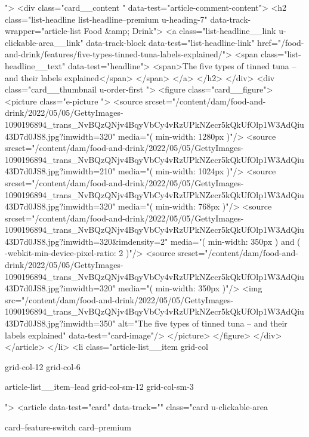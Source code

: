 {{{			 ">
<div class="card__content " data-test="article-comment-content">
<h2 class="list-headline list-headline--premium u-heading-7" data-track-wrapper="article-list Food &amp; Drink">
<a class="list-headline__link u-clickable-area__link" data-track-block data-test="list-headline-link" href="/food-and-drink/features/five-types-tinned-tuna-labels-explained/">
<span class="list-headline__text" data-test="headline">
<span>The five types of tinned tuna – and their labels explained</span>
</span>
</a>
</h2>
</div>
<div class="card__thumbnail u-order-first ">
<figure class="card__figure">
<picture class="e-picture   ">
<source srcset="/content/dam/food-and-drink/2022/05/05/GettyImages-1090196894_trans_NvBQzQNjv4BqyVbCy4vRzUPkNZecr5kQkUfOlp1W3AdQiu43D7d0JS8.jpg?imwidth=320" media="( min-width: 1280px )"/>
<source srcset="/content/dam/food-and-drink/2022/05/05/GettyImages-1090196894_trans_NvBQzQNjv4BqyVbCy4vRzUPkNZecr5kQkUfOlp1W3AdQiu43D7d0JS8.jpg?imwidth=210" media="( min-width: 1024px )"/>
<source srcset="/content/dam/food-and-drink/2022/05/05/GettyImages-1090196894_trans_NvBQzQNjv4BqyVbCy4vRzUPkNZecr5kQkUfOlp1W3AdQiu43D7d0JS8.jpg?imwidth=320" media="( min-width: 768px )"/>
<source srcset="/content/dam/food-and-drink/2022/05/05/GettyImages-1090196894_trans_NvBQzQNjv4BqyVbCy4vRzUPkNZecr5kQkUfOlp1W3AdQiu43D7d0JS8.jpg?imwidth=320&imdensity=2" media="( min-width: 350px ) and ( -webkit-min-device-pixel-ratio: 2 )"/>
<source srcset="/content/dam/food-and-drink/2022/05/05/GettyImages-1090196894_trans_NvBQzQNjv4BqyVbCy4vRzUPkNZecr5kQkUfOlp1W3AdQiu43D7d0JS8.jpg?imwidth=320" media="( min-width: 350px )"/>
<img src="/content/dam/food-and-drink/2022/05/05/GettyImages-1090196894_trans_NvBQzQNjv4BqyVbCy4vRzUPkNZecr5kQkUfOlp1W3AdQiu43D7d0JS8.jpg?imwidth=350" alt="The five types of tinned tuna – and their labels explained" data-test="card-image"/>
</picture>
</figure>
</div>
</article>
</li>
<li class="article-list__item
				grid-col
				
				
				
				grid-col-12
				grid-col-6
				
				
				
				
				article-list__item--lead grid-col-sm-12
				grid-col-sm-3
				
				
				">
<article data-test="card" data-track="" class="card
			u-clickable-area
			
			card--feature-switch
			card--premium
			
			
			
			
			
}}}
